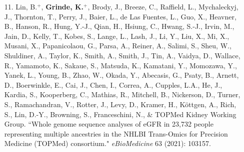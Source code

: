\documentclass[margin]{res}
\begin{document}
\begin{resume}
\begin{itemize}
\item[11.] Lin, B.$^{+}$, \textbf{Grinde, K.}$^{+}$, Brody, J., Breeze, C., Raffield, L., Mychaleckyj, J., Thornton, T., Perry, J., Baier, L., de Las Fuentes, L., Guo, X., Heavner, B., Hanson, R.,  Hung, Y.-J., Qian, H.,  Hsiung, C., Hwang, S.-J., Irvin, M., Jain, D., Kelly, T., Kobes, S.,  Lange, L., Lash, J.,  Li, Y.,  Liu, X.,  Mi, X., Musani, X., Papanicolaou, G., Parsa, A., Reiner, A., Salimi, S., Sheu, W., Shuldiner, A., Taylor, K., Smith, A., Smith, J., Tin, A., Vaidya, D., Wallace, R., Yamamoto, K., Sakaue, S., Matsuda, K.,  Kamatani, Y.,  Momozawa, Y., Yanek, L., Young, B.,  Zhao, W.,  Okada, Y.,  Abecasis, G., Psaty, B.,  Arnett, D.,  Boerwinkle, E.,  Cai, J., Chen, I., Correa, A., Cupples, L.A.,  He, J., Kardia, S.,  Kooperberg, C., Mathias, R., Mitchell, B., Nickerson, D., Turner, S., Ramachandran, V., Rotter, J., Levy, D.,  Kramer, H.,  Köttgen, A., Rich, S., Lin, D.-Y., Browning, S., Franceschini, N., \& TOPMed Kidney Working Group. ``Whole genome sequence analyses of eGFR in 23,732 people representing multiple ancestries in the NHLBI Trans-Omics for Precision Medicine (TOPMed) consortium." \textit{eBioMedicine} 63 (2021): 103157.


\end{itemize}
\end{resume}
\end{document}

